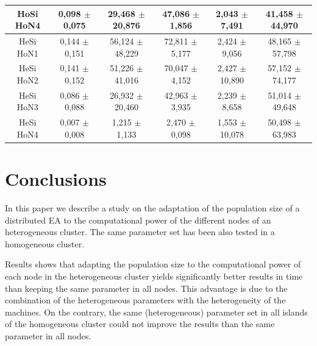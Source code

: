 \documentclass[final,1p,times]{elsarticle}
\begin{document}
\begin{table}[htb]
{\begin{tabular}{|c|c|c|c|c|c|}
HoSi HoN4  &  0,098 $\pm$  0,075  & 29,468 $\pm$ 20,876 & 47,086 $\pm$ 1,856 &  2,043 $\pm$  7,491 &  41,458 $\pm$ 44,970 \\ \hline \hline
HeSi HoN1 &   0,144 $\pm$  0,151 &  56,124 $\pm$ 48,229 & 72,811 $\pm$ 5,177  & 2,424 $\pm$  9,056  & 48,165  $\pm$57,798 \\ \hline
HeSi HoN2 &   0,141 $\pm$  0,152 &  51,226 $\pm$ 41,016 & 70,047 $\pm$ 4,152  & 2,427 $\pm$  10,890 & 57,152  $\pm$74,177 \\ \hline
HeSi HoN3 &   0,086 $\pm$  0,088 &  26,932 $\pm$ 20,460 & 42,963 $\pm$ 3,935  & 2,239 $\pm$  8,658  & 51,014  $\pm$49,648 \\ \hline
HeSi HoN4 &   0,007 $\pm$  0,008 &  1,215  $\pm$ 1,133  & 2,470  $\pm$ 0,098  & 1,553 $\pm$  10,078 & 50,498 $\pm$ 63,983 \\ \hline
\end{tabular}
}
\label{tab:onemaxtimes}
\end{table}

\section{Conclusions}


In this paper we describe a study on the adaptation of the population size of a distributed EA to the computational power of the different nodes of an heterogeneous cluster. The same parameter set has been also tested in a homogeneous cluster. 

Results shows that adapting the population size to the computational power of each node in the heterogeneous cluster yields significantly
better results in time than keeping the same parameter in all nodes. This advantage is due to the combination of the heterogeneous parameters with the heterogeneity of the machines. On the contrary, the same (heterogeneous) parameter set in all islands of the homogeneous cluster could not improve the results than the same parameter in all nodes.
\end{document}
